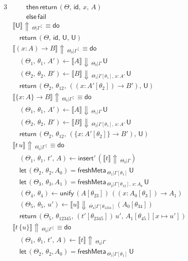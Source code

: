 \documentclass[acmsmall,screen,dvipsnames]{acmart}\settopmatter{}
\newcommand{\slet}{\boldsymbol{\mathsf{let}}}
\renewcommand{\U}{\mathsf{U}}
\newcommand{\id}{\mathsf{id}}
\newcommand{\freshMeta}[3]{\mathsf{freshMeta}\,_{#1|#2}\,#3}
\newcommand{\unify}{\mathsf{unify}}
\newcommand{\fail}{\mathsf{fail}}
\newcommand{\echeck}[4]{\llbracket#1\rrbracket\!\Downarrow\,_{#2|#3}\,#4}
\newcommand{\einfer}[3]{\llbracket#1\rrbracket\!\Uparrow\,_{#2|#3}}
\newcommand{\edo}{\boldsymbol{\mathsf{do}}}
\newcommand{\ereturn}{\boldsymbol{\mathsf{return}}}
\newcommand{\ethen}{\boldsymbol{\mathsf{then}}}
\newcommand{\eelse}{\boldsymbol{\mathsf{else}}}
\newcommand{\einsert}{\mathsf{insert}}
\theoremstyle{remark}
\begin{document}
\begin{alignat*}{3}
  &\qquad   \ethen\, \ereturn\,(\Theta,\,\id,\,x,\,A)\\
  &\qquad   \eelse\, \fail\\
  &\einfer{\U}{\Theta}{\Gamma} :\equiv \edo\\
  &\quad\ereturn\,(\Theta,\,\id,\,\U,\,\U)\\
  &\einfer{(x : A)\to B}{\Theta_0}{\Gamma} :\equiv \edo\\
  &\quad(\Theta_1,\,\theta_1,\,A') \leftarrow \echeck{A}{\Theta_0}{\Gamma}{\U}\\
  &\quad(\Theta_2,\,\theta_2,\,B') \leftarrow
                 \echeck{B}{\Theta_1}{\Gamma[\theta_1],\,x : A'}{\U}\\
  &\quad\ereturn\,(\Theta_2,\,\theta_{12},
                 \,((x : A'[\theta_2])\to B'),\,\U)\\
  &\einfer{\{x : A\}\to B}{\Theta_0}{\Gamma} :\equiv \edo\\
  &\quad(\Theta_1,\,\theta_1,\,A') \leftarrow \echeck{A}{\Theta_1}{\Gamma}{\U}\\
  &\quad(\Theta_2,\,\theta_2,\,B') \leftarrow
                 \echeck{B}{\Theta_2}{\Gamma[\theta_1],\,x : A'}{\U}\\
  &\quad\ereturn\,(\Theta_2,\,\theta_{12},
                 \,(\{x : A'[\theta_2]\}\to B'),\,\U)\\
  &\einfer{t\,u}{\Theta_0}{\Gamma} :\equiv \edo \\
  &\quad (\Theta_1,\,\theta_1,\,t',\,A) \leftarrow \einsert'\,(\einfer{t}{\Theta_0}{\Gamma})\\
  &\quad \slet\,(\Theta_2,\,\theta_2,A_0) = \freshMeta{\Theta_1}{\Gamma[\theta_1]}{\U}\\
  &\quad \slet\,(\Theta_3,\,\theta_3,A_1) = \freshMeta{\Theta_2}{\Gamma[\theta_{12}],\,x:A_0}{\U}\\
  &\quad (\Theta_4,\,\theta_4) \leftarrow \unify\,(A[\theta_{23}])\,((x : A_0[\theta_3])\to A_1)\\
  &\quad (\Theta_5,\,\theta_5,\,u') \leftarrow \echeck{u}{\Theta_4}{\Gamma[\theta_{1234}]}{(A_0[\theta_{34}])}\\
  &\quad \ereturn\,(\Theta_5,\,\theta_{12345},\,(t'[\theta_{2345}])\,u',\,A_1[\theta_{45}][x\mapsto u'])\\
  &\einfer{t\,\{u\}}{\Theta_0}{\Gamma} :\equiv \edo \\
  &\quad (\Theta_1,\,\theta_1,\,t',\,A) \leftarrow \einfer{t}{\Theta_0}{\Gamma}\\
  &\quad \slet\,(\Theta_2,\,\theta_2,A_0) = \freshMeta{\Theta_1}{\Gamma[\theta_1]}{\U}\\

\end{alignat*}
\end{document}
